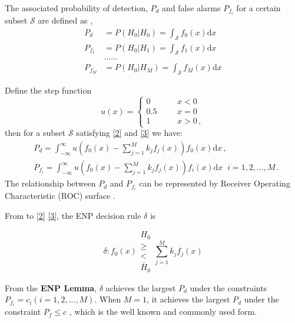 The associated probability of detection, $P_d$ and false alarms $P_{f_i}$ for a certain subset $\mathcal{S}$ are defined as
\cite{neyman1933problem}, 
\begin{equation}
\begin{split}
P_d &= P(H_0 | H_0) = \int_{\mathcal{S}}f_0(x)\mathrm{d}x\\
P_{f_1} &= P(H_0 | H_1) = \int_{\mathcal{S}}f_1(x)\mathrm{d}x\\
&......\\
P_{f_M} &= P(H_0 | H_M) = \int_{\mathcal{S}}f_M(x)\mathrm{d}x
\end{split}
\end{equation}

 Define the step function
\begin{equation}
   \label{equ: step function}
   u(x) = \begin{cases}
     0\;\;\;\;\;\;&x < 0\\
     0.5\;\;\;\;\;\;&x=0\\
     1\;\;\;\;\;\;&x>0\,,
   \end{cases}
\end{equation}
then for a subset $\mathcal{S}$ satisfying \eqref{2} and \eqref{3} we have:
\begin{equation}
\label{equ: pf and pd}
\begin{split}
&P_d = \int_{-\infty}^{\infty} u(f_0(x) - \sum_{j=1}^{M}k_jf_j(x)) f_0(x)\mathrm{d}x	\,, \\
&P_{f_i} = \int_{-\infty}^{\infty} u(f_0(x) - \sum_{j=1}^{M}k_jf_j(x)) f_i(x) \mathrm{d}x\;\;	 i=1, 2, ..., M\,.
\end{split}
\end{equation}
The relationship between $P_d$ and $P_{f_i}$ can be represented by Receiver Operating Characteristic (ROC) surface \cite{LehmannTest}.

From to \eqref{2} \eqref{3}, the ENP decision rule $\delta$ is

\begin{equation}
\label{equ: decision rule}
\delta: f_0(x) \substack{H_0 \\ \geq \\ < \\ \bar{H}_0}  \sum_{j=1}^{M} k_jf_j(x)
\end{equation}

From the  \textbf{ENP Lemma}, $\delta$  achieves the largest $P_d$ under the constraints $P_{f_i} = c_i (i = 1, 2, ..., M)$.
When $M=1$, it achieves the largest $P_d$ under the constraint $P_f \leq c$ \cite{LehmannTest}, which is the well known and commonly used form.

